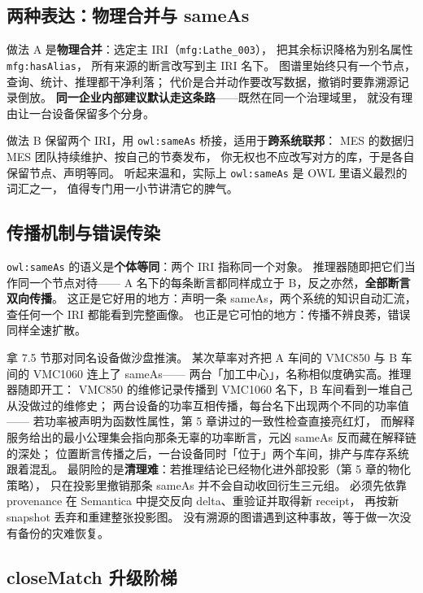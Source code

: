\subsection{两种表达：物理合并与 sameAs}



做法 A 是\textbf{物理合并}：选定主 IRI（\texttt{mfg:Lathe\_003}），
把其余标识降格为别名属性 \texttt{mfg:hasAlias}，
所有来源的断言改写到主 IRI 名下。
图谱里始终只有一个节点，查询、统计、推理都干净利落；
代价是合并动作要改写数据，撤销时要靠溯源记录倒放。
\textbf{同一企业内部建议默认走这条路}——既然在同一个治理域里，
就没有理由让一台设备保留多个分身。

做法 B 保留两个 IRI，用 \texttt{owl:sameAs} 桥接，适用于\textbf{跨系统联邦}：
MES 的数据归 MES 团队持续维护、按自己的节奏发布，
你无权也不应改写对方的库，于是各自保留节点、声明等同。
听起来温和，实际上 \texttt{owl:sameAs} 是 OWL 里语义最烈的词汇之一，
值得专门用一小节讲清它的脾气。

\subsection{传播机制与错误传染}

\texttt{owl:sameAs} 的语义是\textbf{个体等同}：两个 IRI 指称同一个对象。
推理器随即把它们当作同一个节点对待——
A 名下的每条断言都同样成立于 B，反之亦然，\textbf{全部断言双向传播}。
这正是它好用的地方：声明一条 sameAs，两个系统的知识自动汇流，
查任何一个 IRI 都能看到完整画像。
也正是它可怕的地方：传播不辨良莠，错误同样全速扩散。

拿 7.5 节那对同名设备做沙盘推演。
某次草率对齐把 A 车间的 VMC850 与 B 车间的 VMC1060 连上了 sameAs——
两台「加工中心」，名称相似度确实高。推理器随即开工：
VMC850 的维修记录传播到 VMC1060 名下，B 车间看到一堆自己从没做过的维修史；
两台设备的功率互相传播，每台名下出现两个不同的功率值——
若功率被声明为函数性属性，第 5 章讲过的一致性检查直接亮红灯，
而解释服务给出的最小公理集会指向那条无辜的功率断言，元凶 sameAs 反而藏在解释链的深处；
位置断言传播之后，一台设备同时「位于」两个车间，排产与库存系统跟着混乱。
最阴险的是\textbf{清理难}：若推理结论已经物化进外部投影（第 5 章的物化策略），
只在投影里撤销那条 sameAs 并不会自动收回衍生三元组。
必须先依靠 provenance 在 Semantica 中提交反向 delta、重验证并取得新 receipt，
再按新 snapshot 丢弃和重建整张投影图。
没有溯源的图谱遇到这种事故，等于做一次没有备份的灾难恢复。

\subsection{closeMatch 升级阶梯}

